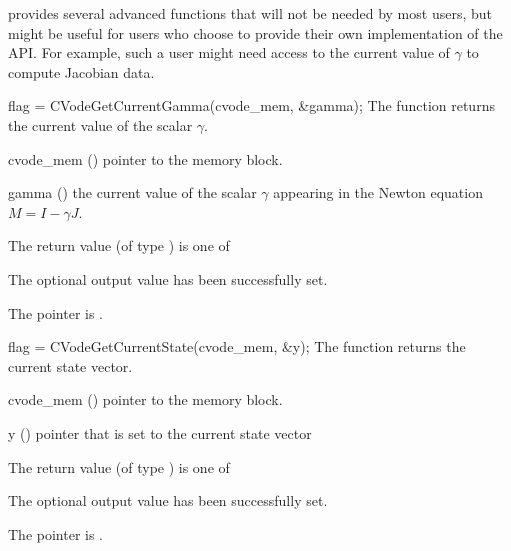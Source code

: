 {\cvode} provides several advanced functions that will not be needed by most
users, but might be useful for users who choose to provide their own
implementation of the  API. For example, such a user
might need access to the current value of $\gamma$ to compute Jacobian data.

{
  flag = CVodeGetCurrentGamma(cvode\_mem, \&gamma);
}
{
  The function  returns the current
  value of the scalar $\gamma$.
}
{
  \begin{args}
  \item[cvode\_mem] ()
    pointer to the {\cvode} memory block.
  \item[gamma] ()
      the current value of the scalar $\gamma$ appearing in the
      Newton equation $M = I - \gamma J$.
  \end{args}
}
{
  The return value  (of type ) is one of
  \begin{args}
  \item[\Id{CV\_SUCCESS}]
    The optional output value has been successfully set.
  \item[\Id{CV\_MEM\_NULL}]
    The  pointer is .
  \end{args}
}
{}
{
  flag = CVodeGetCurrentState(cvode\_mem, \&y);
}
{
  The function  returns the current state vector.
}
{
  \begin{args}
  \item[cvode\_mem] ()
    pointer to the {\cvode} memory block.
  \item[y] ()
    pointer that is set to the current state vector
  \end{args}
}
{
  The return value  (of type ) is one of
  \begin{args}
  \item[\Id{CV\_SUCCESS}]
    The optional output value has been successfully set.
  \item[\Id{CV\_MEM\_NULL}]
    The  pointer is .
  \end{args}
}
{}






